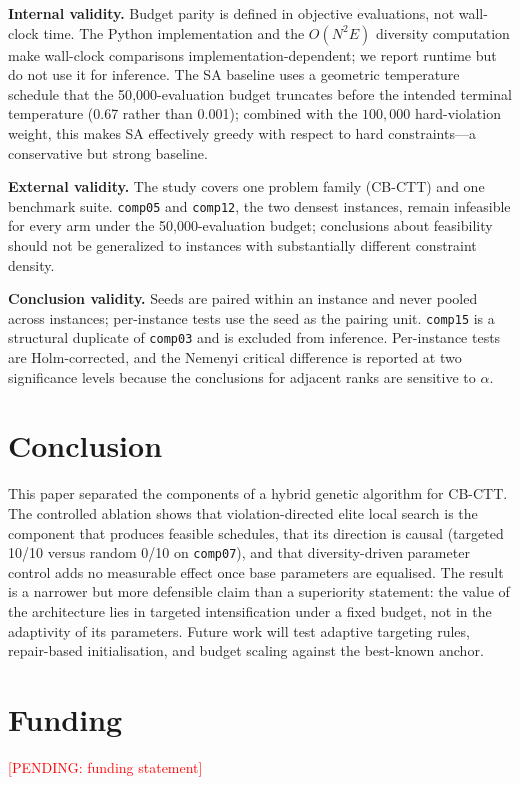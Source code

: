 \documentclass[journal]{IEEEtran}
\newcommand{\pending}[1]{\textcolor{red}{[PENDING: #1]}}
\newcommand{\code}[1]{\texttt{#1}}
\begin{document}
\textbf{Internal validity.} Budget parity is defined in objective evaluations, not wall-clock time. The Python implementation and the $O(N^2E)$ diversity computation make wall-clock comparisons implementation-dependent; we report runtime but do not use it for inference. The SA baseline uses a geometric temperature schedule that the 50{,}000-evaluation budget truncates before the intended terminal temperature (0.67 rather than 0.001); combined with the $100{,}000$ hard-violation weight, this makes SA effectively greedy with respect to hard constraints---a conservative but strong baseline.

\textbf{External validity.} The study covers one problem family (CB-CTT) and one benchmark suite. \code{comp05} and \code{comp12}, the two densest instances, remain infeasible for every arm under the 50{,}000-evaluation budget; conclusions about feasibility should not be generalized to instances with substantially different constraint density.

\textbf{Conclusion validity.} Seeds are paired within an instance and never pooled across instances; per-instance tests use the seed as the pairing unit. \code{comp15} is a structural duplicate of \code{comp03} and is excluded from inference. Per-instance tests are Holm-corrected, and the Nemenyi critical difference is reported at two significance levels because the conclusions for adjacent ranks are sensitive to $\alpha$.

\section{Conclusion}
This paper separated the components of a hybrid genetic algorithm for CB-CTT. The controlled ablation shows that violation-directed elite local search is the component that produces feasible schedules, that its direction is causal (targeted 10/10 versus random 0/10 on \code{comp07}), and that diversity-driven parameter control adds no measurable effect once base parameters are equalised. The result is a narrower but more defensible claim than a superiority statement: the value of the architecture lies in targeted intensification under a fixed budget, not in the adaptivity of its parameters. Future work will test adaptive targeting rules, repair-based initialisation, and budget scaling against the best-known anchor.

\section*{Funding}
\pending{funding statement}
\end{document}
